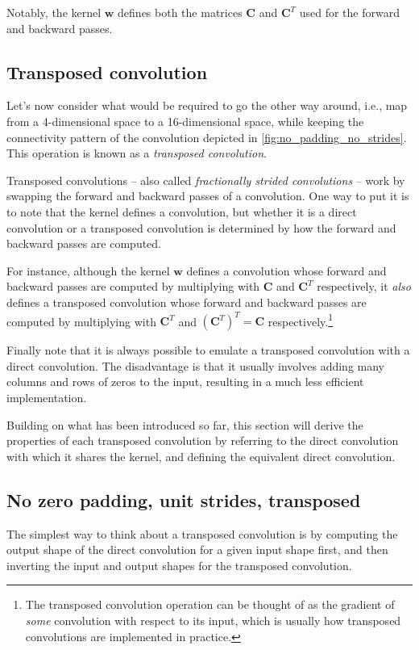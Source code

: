 Notably, the kernel $\mathbf{w}$ defines both the matrices $\mathbf{C}$ and
$\mathbf{C}^T$ used for the forward and backward passes.

\subsection{Transposed convolution}

Let's now consider what would be required to go the other way around, i.e., map
from a 4-dimensional space to a 16-dimensional space, while keeping the
connectivity pattern of the convolution depicted in
\autoref{fig:no_padding_no_strides}. This operation is known as a {\em
transposed convolution}.

Transposed convolutions -- also called {\em fractionally strided convolutions\/}
-- work by swapping the forward and backward passes of a convolution. One way to
put it is to note that the kernel defines a convolution, but whether it is a
direct convolution or a transposed convolution is determined by how the forward
and backward passes are computed.

For instance, although the kernel $\mathbf{w}$ defines a convolution whose
forward and backward passes are computed by multiplying with $\mathbf{C}$ and
$\mathbf{C}^T$ respectively, it {\em also\/} defines a transposed convolution
whose forward and backward passes are computed by multiplying with
$\mathbf{C}^T$ and $(\mathbf{C}^T)^T = \mathbf{C}$ respectively.\footnote{The
    transposed convolution operation can be thought of as the gradient of {\em
    some\/} convolution with respect to its input, which is usually how
    transposed convolutions are implemented in practice.}

Finally note that it is always possible to emulate a transposed convolution
with a direct convolution. The disadvantage is that it usually involves adding
many columns and rows of zeros to the input, resulting in a much less efficient
implementation.

Building on what has been introduced so far, this section will derive the
properties of each transposed convolution by referring to the direct
convolution with which it shares the kernel, and defining the equivalent direct
convolution.

\subsection{No zero padding, unit strides, transposed}

The simplest way to think about a transposed convolution is by computing the
output shape of the direct convolution for a given input shape first, and then
inverting the input and output shapes for the transposed convolution.

